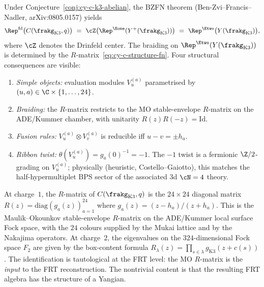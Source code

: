\begin{conjecture}
\label{conj:cy-c-k3-rep}
Under Conjecture~\ref{conj:cy-c-k3-abelian}, the BZFN theorem (Ben-Zvi--Francis--Nadler, arXiv:0805.0157) yields
\begin{equation}
 \Rep^{\mathrm{fd}}\bigl(C(\frakg_{\mathrm{K3}}, q)\bigr)
 \ = \ \cZ\bigl(\Rep^{\Eone}(Y^+(\frakg_{\mathrm{K3}}))\bigr)
 \ = \ \Rep^{\Etwo}\bigl(Y(\frakg_{\mathrm{K3}})\bigr),
 \label{eq:cy-c-k3-rep}
\end{equation}
where $\cZ$ denotes the Drinfeld center. The braiding on $\Rep^{\Etwo}(Y(\frakg_{\mathrm{K3}}))$ is determined by the $R$-matrix~\eqref{eq:cy-c-structure-fn}. Four structural consequences are visible:
\begin{enumerate}[label=\textup{(V\arabic*)}]
 \item \emph{Simple objects:} evaluation modules $V_u^{(a)}$ parametrised by $(u, a) \in \C \times \{1, \ldots, 24\}$.
 \item \emph{Braiding:} the $R$-matrix restricts to the MO stable-envelope $R$-matrix on the ADE/Kummer chamber, with unitarity $R(z)R(-z) = \mathrm{Id}$.
 \item \emph{Fusion rules:} $V_u^{(a)} \otimes V_v^{(a)}$ is reducible iff $u - v = \pm h_a$.
 \item \emph{Ribbon twist:} $\theta(V_u^{(a)}) = g_a(0)^{-1} = -1$. The $-1$ twist is a fermionic $\Z/2$-grading on $V_u^{(a)}$; physically (heuristic, Costello--Gaiotto), this matches the half-hypermultiplet BPS sector of the associated 3d $\cN=4$ theory.
\end{enumerate}
\end{conjecture}

\begin{remark}
\label{rem:cy-c-rmatrix-mo}
At charge~$1$, the $R$-matrix of $C(\frakg_{\mathrm{K3}}, q)$ is the $24 \times 24$ diagonal matrix $R(z) = \mathrm{diag}(g_a(z))_{a=1}^{24}$ where $g_a(z) = (z - h_a)/(z + h_a)$. This is the Maulik--Okounkov stable-envelope \(R\)-matrix on the ADE/Kummer local surface Fock space, with the \(24\) colours supplied by the Mukai lattice and by the Nakajima operators. At charge~$2$, the eigenvalues on the $324$-dimensional Fock space $F_2$ are given by the box-content formula $R_\lambda(z) = \prod_{s \in \lambda} g_{\mathrm{K3}}(z + c(s))$. The identification is tautological at the FRT level: the MO $R$-matrix is the \emph{input} to the FRT reconstruction. The nontrivial content is that the resulting FRT algebra has the structure of a Yangian.
\end{remark}

